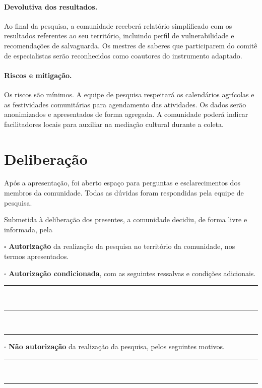 \documentclass[12pt,a4paper,brazil]{article}
\begin{document}
\paragraph{Devolutiva dos resultados.} Ao final da pesquisa, a comunidade receberá relatório simplificado com os resultados referentes ao seu território, incluindo perfil de vulnerabilidade e recomendações de salvaguarda. Os mestres de saberes que participarem do comitê de especialistas serão reconhecidos como coautores do instrumento adaptado.

\paragraph{Riscos e mitigação.} Os riscos são mínimos. A equipe de pesquisa respeitará os calendários agrícolas e as festividades comunitárias para agendamento das atividades. Os dados serão anonimizados e apresentados de forma agregada. A comunidade poderá indicar facilitadores locais para auxiliar na mediação cultural durante a coleta.

\section*{Deliberação}

Após a apresentação, foi aberto espaço para perguntas e esclarecimentos dos membros da comunidade. Todas as dúvidas foram respondidas pela equipe de pesquisa.

\vspace{0.5cm}

\noindent Submetida à deliberação dos presentes, a comunidade decidiu, de forma livre e informada, pela

\vspace{0.3cm}

\noindent
$\square$ \textbf{Autorização} da realização da pesquisa no território da comunidade, nos termos apresentados.

\noindent
$\square$ \textbf{Autorização condicionada}, com as seguintes ressalvas e condições adicionais.

\noindent
\rule{\textwidth}{0.4pt}\\
\rule{\textwidth}{0.4pt}\\
\rule{\textwidth}{0.4pt}

\noindent
$\square$ \textbf{Não autorização} da realização da pesquisa, pelos seguintes motivos.

\noindent
\rule{\textwidth}{0.4pt}\\
\rule{\textwidth}{0.4pt}
\end{document}
